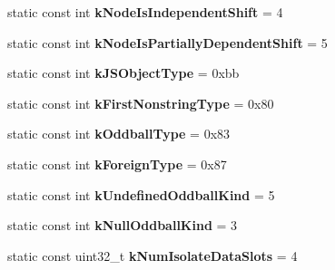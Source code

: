 \begin{DoxyCompactItemize}
\item 
\hypertarget{classv8_1_1internal_1_1Internals_a228b2b58c77c17bc512b92d9e3aea48b}{static const int {\bfseries k\-Node\-Is\-Independent\-Shift} = 4}\label{classv8_1_1internal_1_1Internals_a228b2b58c77c17bc512b92d9e3aea48b}

\item 
\hypertarget{classv8_1_1internal_1_1Internals_aeda4d6fc1bd10ca57398597f3bb496f3}{static const int {\bfseries k\-Node\-Is\-Partially\-Dependent\-Shift} = 5}\label{classv8_1_1internal_1_1Internals_aeda4d6fc1bd10ca57398597f3bb496f3}

\item 
\hypertarget{classv8_1_1internal_1_1Internals_a56b7062df5d9a7df491137d4c3341bcc}{static const int {\bfseries k\-J\-S\-Object\-Type} = 0xbb}\label{classv8_1_1internal_1_1Internals_a56b7062df5d9a7df491137d4c3341bcc}

\item 
\hypertarget{classv8_1_1internal_1_1Internals_a6f4a54927b01a11f444fb2f00b47ca1d}{static const int {\bfseries k\-First\-Nonstring\-Type} = 0x80}\label{classv8_1_1internal_1_1Internals_a6f4a54927b01a11f444fb2f00b47ca1d}

\item 
\hypertarget{classv8_1_1internal_1_1Internals_a13081e936f8c96472f1b1496c70d4dc1}{static const int {\bfseries k\-Oddball\-Type} = 0x83}\label{classv8_1_1internal_1_1Internals_a13081e936f8c96472f1b1496c70d4dc1}

\item 
\hypertarget{classv8_1_1internal_1_1Internals_a263195f36f9e8ee64af70dc267a85d55}{static const int {\bfseries k\-Foreign\-Type} = 0x87}\label{classv8_1_1internal_1_1Internals_a263195f36f9e8ee64af70dc267a85d55}

\item 
\hypertarget{classv8_1_1internal_1_1Internals_a39072b9e0ffea4031f4a1c514208b20d}{static const int {\bfseries k\-Undefined\-Oddball\-Kind} = 5}\label{classv8_1_1internal_1_1Internals_a39072b9e0ffea4031f4a1c514208b20d}

\item 
\hypertarget{classv8_1_1internal_1_1Internals_a72243c5512cb5cab9d10b6f29e775180}{static const int {\bfseries k\-Null\-Oddball\-Kind} = 3}\label{classv8_1_1internal_1_1Internals_a72243c5512cb5cab9d10b6f29e775180}

\item 
\hypertarget{classv8_1_1internal_1_1Internals_a258de87ae638f06a1deebccf4fd93c3f}{static const uint32\-\_\-t {\bfseries k\-Num\-Isolate\-Data\-Slots} = 4}\label{classv8_1_1internal_1_1Internals_a258de87ae638f06a1deebccf4fd93c3f}

\end{DoxyCompactItemize}


